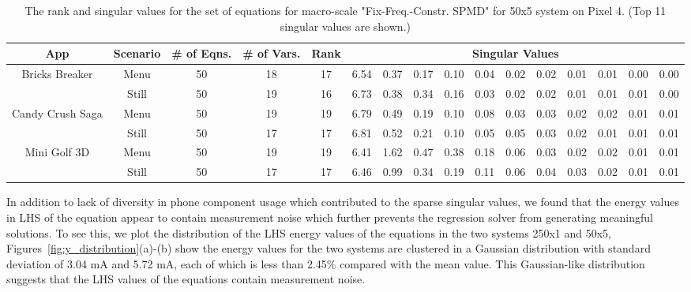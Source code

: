 \begin{table}[tp]
{\small
    \centering
    \caption{The rank and singular values for the set of equations for macro-scale "Fix-Freq.-Constr. SPMD" for 50x5 system on Pixel 4. (Top 11 singular values are shown.)}
    \vspace{-0.1in}
    \begin{tabular}{|c|c|c|c|c|c|c|c|c|c|c|c|c|c|c|c|}
    \hline
        App & Scenario & \# of Eqns. & \# of Vars. & Rank &  \multicolumn{11}{c|}{Singular Values} \\
        \hline
         \multirow{2}{15mm}{Bricks Breaker} & Menu & 50 & 18 & 17 & 6.54  & 0.37  & 0.17  & 0.10  & 0.04  & 0.02  & 0.02  & 0.01  & 0.01  & 0.00  & 0.00 \\
         \cline{2-16}
         & Still &  50 & 19 & 16 & 6.73  & 0.38  & 0.34  & 0.16  & 0.03  & 0.02  & 0.02  & 0.01  & 0.01  & 0.01  & 0.00 \\
         \hline
        \multirow{2}{15mm}{Candy Crush Saga} & Menu &  50 & 19 & 19 & 6.79  & 0.49  & 0.19  & 0.10  & 0.08  & 0.03  & 0.03  & 0.02  & 0.02  & 0.01  & 0.01 \\
         \cline{2-16}
         & Still & 50 & 17 & 17 & 6.81  & 0.52  & 0.21  & 0.10  & 0.05  & 0.05  & 0.03  & 0.02  & 0.01  & 0.01  & 0.01 \\
         \hline
        \multirow{2}{15mm}{Mini Golf 3D} & Menu & 50 & 19 & 19 & 6.41  & 1.62  & 0.47  & 0.38  & 0.18  & 0.06  & 0.03  & 0.02  & 0.02  & 0.01  & 0.01 \\
        \cline{2-16}
	     & Still & 50 & 17 & 17 & 6.46  & 0.99  & 0.34  & 0.19  & 0.11  & 0.06  & 0.04  & 0.03  & 0.02  & 0.01  & 0.01 \\
	     \hline
    \end{tabular}
    \label{tab:macro_singularvalues}
    \vspace{-0.1in}
}
\end{table}


In addition to lack of diversity in phone component usage which contributed 
to the sparse singular values, we found that the energy values in LHS of the equation   appear to contain 
measurement noise which further prevents the regression solver from generating meaningful solutions.
To see this, we plot the distribution of the LHS energy values of the 
equations in the two systems 250x1 and 50x5, 
Figures~\ref{fig:y_distribution}(a)-(b) 
show the energy values for the two systems are clustered in a Gaussian distribution with standard deviation of 3.04 mA and 5.72 mA, 
each of which is less than 2.45\% compared with the mean value.
This Gaussian-like distribution suggests that the LHS values of the equations contain
measurement noise.

